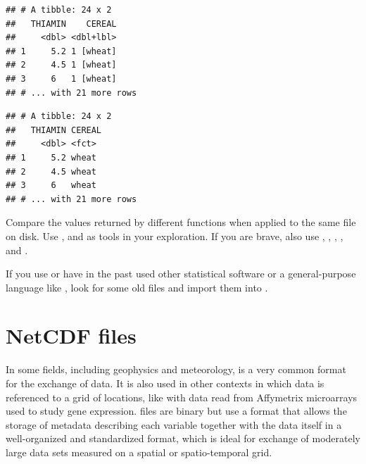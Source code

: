 \documentclass[krantz2]{krantz}\usepackage{knitr}
\begin{document}
\begin{knitrout}\footnotesize
{}\color{fgcolor}\begin{kframe}
\begin{alltt}
 \hlkwb{<-} \hlstd{(} \hlstd{=} \hlstd{)}
\end{alltt}
\begin{verbatim}
## # A tibble: 24 x 2
##   THIAMIN    CEREAL
##     <dbl> <dbl+lbl>
## 1     5.2 1 [wheat]
## 2     4.5 1 [wheat]
## 3     6   1 [wheat]
## # ... with 21 more rows
\end{verbatim}
\begin{alltt}
 \hlkwb{<-} 
\end{alltt}
\begin{verbatim}
## # A tibble: 24 x 2
##   THIAMIN CEREAL
##     <dbl> <fct>
## 1     5.2 wheat
## 2     4.5 wheat
## 3     6   wheat
## # ... with 21 more rows
\end{verbatim}
\end{kframe}
\end{knitrout}

\begin{playground}
Compare the values returned by different  functions when applied to the same file on disk. Use ,  and  as tools in your exploration. If you are brave, also use , , , ,  and .
\end{playground}

\begin{playground}
If you use or have in the past used other statistical software or a general-purpose language like , look for some old files and import them into \Rlang.
\end{playground}

\section{NetCDF files}

In some fields, including geophysics and meteorology,  is a very common format for the exchange of data. It is also used in other contexts in which data is referenced to a grid of locations, like with data read from Affymetrix microarrays used to study gene expression.  files are binary but use a format that allows the storage of metadata describing each variable together with the data itself in a well-organized and standardized format, which is ideal for exchange of moderately large data sets measured on a spatial or spatio-temporal grid.
\end{document}
